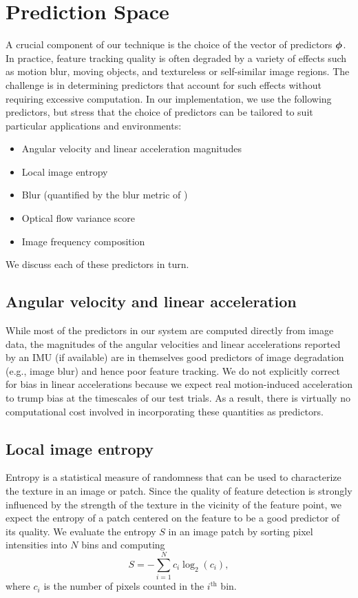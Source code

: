 \section{Prediction Space} \label{sec:predictors}
A crucial component of our technique is the choice of the vector of predictors $\boldsymbol{\mathbf{\phi}}$.
In practice, feature tracking quality is often degraded by a variety of effects such as motion blur, moving objects, and textureless or self-similar image regions.
The challenge is in determining predictors that account for such effects without requiring excessive computation.
In our implementation, we use the following predictors, but stress that the choice of predictors can be tailored to suit particular applications and environments:
\begin{itemize}
    \item Angular velocity and linear acceleration magnitudes
    \item Local image entropy
    \item Blur (quantified by the blur metric of \cite{crete2007blur})
    \item Optical flow variance score
    \item Image frequency composition
\end{itemize}
We discuss each of these predictors in turn.


\subsection{Angular velocity and linear acceleration}
While most of the predictors in our system are computed directly from image data, the magnitudes of the angular velocities and linear accelerations reported by an IMU (if available) are in themselves good predictors of image degradation (e.g., image blur) and hence poor feature tracking. 
We do not explicitly correct for bias in linear accelerations because we expect real motion-induced acceleration to trump bias at the timescales of our test trials.  As a result, there is virtually no computational cost involved in incorporating these quantities as predictors.

\subsection{Local image entropy}
Entropy is a statistical measure of randomness that can be used to characterize the texture in an image or patch.
Since the quality of feature detection is strongly influenced by the strength of the texture in the vicinity of the feature point, we expect the entropy of a patch centered on the feature to be a good predictor of its quality.
We evaluate the entropy $S$ in an image patch by sorting pixel intensities into $N$ bins and computing
\begin{equation}
    S = -\sum_{i=1}^N c_i \log_2(c_i),
\end{equation}
where $c_i$ is the number of pixels counted in the $i^\text{th}$ bin.


